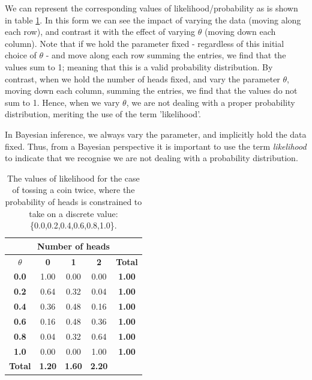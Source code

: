 \documentclass[11pt,fullpage]{book}
\begin{document}
We can represent the corresponding values of likelihood/probability as is shown in table \ref{tab:Likeihood_BayesBox}. In this form we can see the impact of varying the data (moving along each row), and contrast it with the effect of varying $\theta$ (moving down each column). Note that if we hold the parameter fixed - regardless of this initial choice of $\theta$ - and move along each row summing the entries, we find that the values sum to 1; meaning that this is a valid probability distribution. By contrast, when we hold the number of heads fixed, and vary the parameter $\theta$, moving down each column, summing the entries, we find that the values do not sum to 1. Hence, when we vary $\theta$, we are not dealing with a proper probability distribution, meriting the use of the term 'likelihood'.

In Bayesian inference, we always vary the parameter, and implicitly hold the data fixed. Thus, from a Bayesian perspective it is important to use the term \textit{likelihood} to indicate that we recognise we are not dealing with a probability distribution.


\begin{table}[htbp]
  \centering
  
    \begin{tabular}{ccccc}
    \multicolumn{5}{c}{\textbf{Number of heads}} \\
    \midrule
    \textbf{$\theta$} & \multicolumn{1}{c}{\textbf{0}} & \multicolumn{1}{c}{\textbf{1}} & \multicolumn{1}{c}{\textbf{2}} &  \multicolumn{1}{c}{\textbf{Total}} \\
    \hline
    \textbf{0.0} & \multicolumn{1}{c}{1.00} & \multicolumn{1}{c}{0.00} & \multicolumn{1}{c}{0.00} & \multicolumn{1}{c}{\textbf{1.00}} \\
    \textbf{0.2} & \multicolumn{1}{c}{0.64} & \multicolumn{1}{c}{0.32} & \multicolumn{1}{c}{0.04} & \multicolumn{1}{c}{\textbf{1.00}} \\
    \textbf{0.4} & \multicolumn{1}{c}{0.36} & \multicolumn{1}{c}{0.48} & \multicolumn{1}{c}{0.16} & \multicolumn{1}{c}{\textbf{1.00}} \\
    \textbf{0.6} & \multicolumn{1}{c}{0.16} & \multicolumn{1}{c}{0.48} & \multicolumn{1}{c}{0.36} & \multicolumn{1}{c}{\textbf{1.00}} \\
    \textbf{0.8} & \multicolumn{1}{c}{0.04} & \multicolumn{1}{c}{0.32} & \multicolumn{1}{c}{0.64} & \multicolumn{1}{c}{\textbf{1.00}} \\
    \textbf{1.0} & \multicolumn{1}{c}{0.00} & \multicolumn{1}{c}{0.00} & \multicolumn{1}{c}{1.00} & \multicolumn{1}{c}{\textbf{1.00}} \\
    \bottomrule
    \textbf{Total} & \multicolumn{1}{c}{\textbf{1.20}} & \multicolumn{1}{c}{\textbf{1.60}} & \multicolumn{1}{c}{\textbf{2.20}} &  \\
    
    \end{tabular}%
  \caption{The values of likelihood for the case of tossing a coin twice, where the probability of heads is constrained to take on a discrete value: \{0.0,0.2,0.4,0.6,0.8,1.0\}.}\label{tab:Likeihood_BayesBox}
\end{table}
\end{document}
